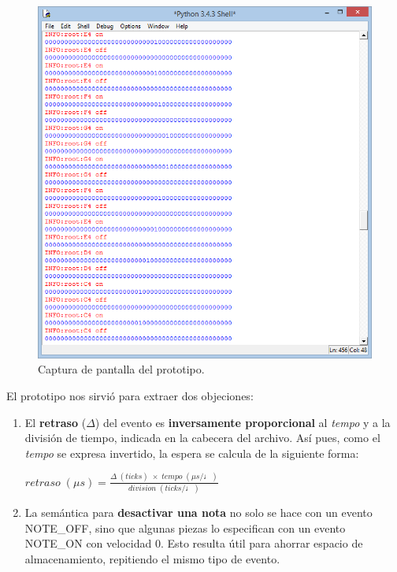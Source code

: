 \begin{figure}[H]
	\noindent \begin{centering}
		\includegraphics[width=\linewidth/2]{capitulo5/cap_pytest}
		\par\end{centering}
	\smallskip
	\caption{\label{fig:cap_pytest} Captura de pantalla del prototipo.}
\end{figure}

\smallskip

El prototipo nos sirvió para extraer dos objeciones:

\begin{enumerate}
	\item El \textbf{retraso} ($\Delta$) del evento es \textbf{inversamente proporcional} al \textit{tempo} y a la división de tiempo, indicada en la cabecera del archivo. Así pues, como el \textit{tempo} se expresa invertido, la espera se calcula de la siguiente forma:
	
	\begin{center}
		$retraso \; (\mu s)  = \frac{\Delta \; (ticks) \; \times \; tempo \; (\mu s / \quarternote)}{division \; (ticks / \quarternote)}$
	\end{center}
	
	\item La semántica para \textbf{desactivar una nota} no solo se hace con un evento NOTE\_OFF, sino que algunas piezas lo especifican con un evento NOTE\_ON con velocidad 0. Esto resulta útil para ahorrar espacio de almacenamiento, repitiendo el mismo tipo de evento.
\end{enumerate}

